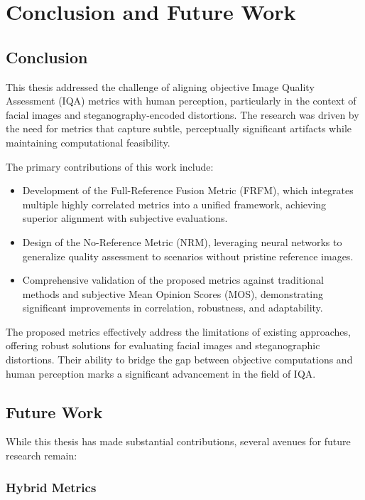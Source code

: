 \chapter{Conclusion and Future Work}

\section{Conclusion}

This thesis addressed the challenge of aligning objective Image Quality Assessment (IQA) metrics with human perception, particularly in the context of facial images and steganography-encoded distortions. The research was driven by the need for metrics that capture subtle, perceptually significant artifacts while maintaining computational feasibility.

The primary contributions of this work include:
\begin{itemize}
    \item Development of the Full-Reference Fusion Metric (FRFM), which integrates multiple highly correlated metrics into a unified framework, achieving superior alignment with subjective evaluations.
    \item Design of the No-Reference Metric (NRM), leveraging neural networks to generalize quality assessment to scenarios without pristine reference images.
    \item Comprehensive validation of the proposed metrics against traditional methods and subjective Mean Opinion Scores (MOS), demonstrating significant improvements in correlation, robustness, and adaptability.
\end{itemize}

The proposed metrics effectively address the limitations of existing approaches, offering robust solutions for evaluating facial images and steganographic distortions. Their ability to bridge the gap between objective computations and human perception marks a significant advancement in the field of IQA.

\section{Future Work}

While this thesis has made substantial contributions, several avenues for future research remain:

\subsection{Hybrid Metrics}

